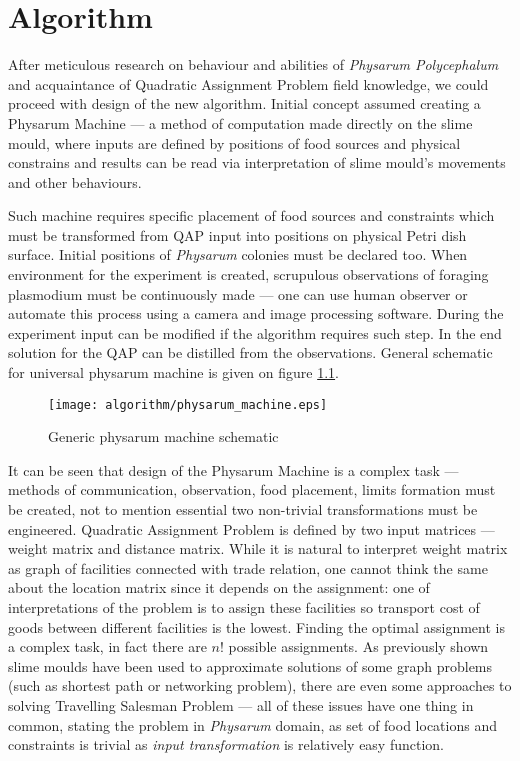 \chapter{Algorithm}
\label{chapter:algorithm}

After meticulous research on behaviour and abilities of \textit{Physarum Polycephalum} and acquaintance of Quadratic Assignment Problem field knowledge, we could proceed with design of the new algorithm. Initial concept assumed creating a Physarum Machine --- a method of computation made directly on the slime mould, where inputs are defined by positions of food sources and physical constrains and results can be read via interpretation of slime mould's movements and other behaviours.

Such machine requires specific placement of food sources and constraints which must be transformed from QAP input into positions on physical Petri dish surface. Initial positions of \textit{Physarum} colonies must be declared too. When environment for the experiment is created, scrupulous observations of foraging plasmodium must be continuously made --- one can use human observer or automate this process using a camera and image processing software. During the experiment input can be modified if the algorithm requires such step. In the end solution for the QAP can be distilled from the observations. General schematic for universal physarum machine is given on figure \ref{figure:a_machine}.

\begin{figure}
  \centering
  \texttt{[image: algorithm/physarum\_machine.eps]}
  \caption{Generic physarum machine schematic}
  \label{figure:a_machine}
\end{figure}

It can be seen that design of the Physarum Machine is a complex task --- methods of communication, observation, food placement, limits formation must be created, not to mention essential two non-trivial transformations must be engineered. Quadratic Assignment Problem is defined by two input matrices --- weight matrix and distance matrix. While it is natural to interpret weight matrix as graph of facilities connected with trade relation, one cannot think the same about the location matrix since it depends on the assignment: one of interpretations of the problem is to assign these facilities so transport cost of goods between different facilities is the lowest. Finding the optimal assignment is a complex task, in fact there are $n!$ possible assignments. As previously shown slime moulds have been used to approximate solutions of some graph problems (such as shortest path or networking problem), there are even some approaches to solving Travelling Salesman Problem --- all of these issues have one thing in common, stating the problem in \textit{Physarum} domain, as set of food locations and constraints is trivial as \textit{input transformation} is relatively easy function. 

